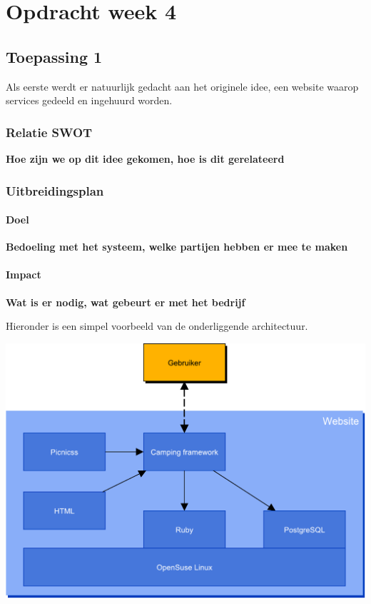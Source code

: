 \chapter{Opdracht week 4}

\section{Toepassing 1}

Als eerste werdt er natuurlijk gedacht aan het originele idee,
een website waarop services gedeeld en ingehuurd worden.

\subsection{Relatie SWOT}
{\bf Hoe zijn we op dit idee gekomen, hoe is dit gerelateerd}

\subsection{Uitbreidingsplan}

\subsubsection{Doel}
{\bf Bedoeling met het systeem, welke partijen hebben er mee te maken}

\subsubsection{Impact}
{\bf Wat is er nodig, wat gebeurt er met het bedrijf}

Hieronder is een simpel voorbeeld van de onderliggende architectuur.

\includegraphics[width=\textwidth]{img/websiteArchitecture}


